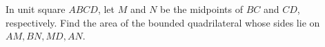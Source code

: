 In unit square $ABCD$, let $M$ and $N$ be the midpoints of $BC$ and $CD$, respectively. Find the area of the bounded quadrilateral whose sides lie on $AM,BN,MD,AN$.
